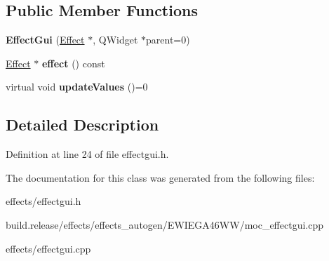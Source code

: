 \subsection*{Public Member Functions}
\begin{DoxyCompactItemize}
\item 
\mbox{\label{class_ms_1_1_effect_gui_a0e6826cf1e024b33d0da5335b82bb044}} 
{\bfseries Effect\+Gui} (\hyperlink{class_ms_1_1_effect}{Effect} $\ast$, Q\+Widget $\ast$parent=0)
\item 
\mbox{\label{class_ms_1_1_effect_gui_a35963c231086a6f246d219a85f9478ad}} 
\hyperlink{class_ms_1_1_effect}{Effect} $\ast$ {\bfseries effect} () const
\item 
\mbox{\label{class_ms_1_1_effect_gui_aa9ba94cea72891fb65af4b8b8110613a}} 
virtual void {\bfseries update\+Values} ()=0
\end{DoxyCompactItemize}


\subsection{Detailed Description}


Definition at line 24 of file effectgui.\+h.



The documentation for this class was generated from the following files\+:\begin{DoxyCompactItemize}
\item 
effects/effectgui.\+h\item 
build.\+release/effects/effects\+\_\+autogen/\+E\+W\+I\+E\+G\+A46\+W\+W/moc\+\_\+effectgui.\+cpp\item 
effects/effectgui.\+cpp\end{DoxyCompactItemize}
